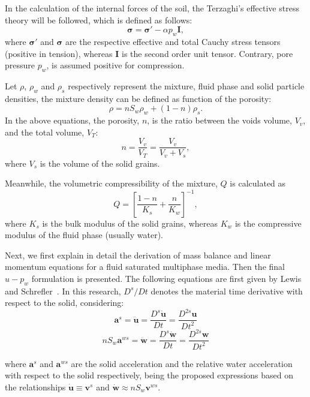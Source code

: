 \documentclass[twocolumn]{svjour3}          %
\begin{document}
In the calculation of the internal forces of the soil, the Terzaghi's effective stress theory  \cite{Terzaghi1925} will be followed, which is defined as follows:
\begin{equation}\label{eq_uw5}
 \boldsymbol{ \sigma} =\boldsymbol{ \sigma'} - \alpha p_{w}\textbf{I},
\end{equation}
where $ \boldsymbol{ \sigma'} $ and  $\boldsymbol{ \sigma}$ are the respective effective and total Cauchy stress tensors (positive in tension), whereas $\textbf{I}$ is the second order unit tensor.  Contrary, pore pressure $p_w$, is assumed positive for compression.

Let $\rho$, $\rho_{w}$ and $\rho_{s}$ respectively represent the mixture, fluid phase and solid particle densities,   the mixture density can be  defined as function of the porosity:
\begin{equation}\label{eq_uw2}
\rho=n S_w \rho_{w}+(1-n) \rho_s.
\end{equation}
In the above equations, the porosity, $n$, is the ratio  between the voids volume, $V_v$, and the total volume, $V_T$:
\begin{equation}\label{eq_uw3}
n=\frac{V_v}{V_T}=\frac{V_v}{V_v+V_s},
\end{equation}
where $V_s$ is the volume of the solid grains.

Meanwhile, the volumetric compressibility of the mixture, $Q$ \cite{Zienkiewicz99} is calculated as
\begin{equation}\label{eq_uw4}
Q = \left[ \frac{1-n}{K_s} + \frac{n}{K_w} \right]^{-1},
\end{equation}
where $K_s$ is the bulk modulus of  the solid grains, whereas  $K_w$ is  the compressive modulus of the fluid phase (usually water).

Next, we first  explain in detail the derivation of mass balance and linear momentum equations for a fluid saturated multiphase media. Then the final $u-p_w$ formulation is presented. The following equations are first given by Lewis and Schrefler~\cite{LewisSchrefler98}. In this research, $D^s/Dt$ denotes the material time derivative with respect to the solid, considering:
$$
\boldsymbol{a}^s =  \ddot{\boldsymbol{u}} = \frac{D^s \dot{\boldsymbol{u}}}{Dt} = \frac{D^{2s} \boldsymbol{u}}{Dt^2}
$$
$$
n S_w \boldsymbol{a}^{ws} =  \ddot{\boldsymbol{w}} = \frac{D^s \dot{\boldsymbol{w}}}{Dt} = \frac{D^{2s} \boldsymbol{w}}{Dt^2}
$$

where  $\boldsymbol{a}^s$ and $\boldsymbol{a}^{ws}$ are the solid acceleration and the relative water acceleration with respect to the solid respectively, being the proposed expressions based on the relationships $\boldsymbol{\dot{u}} \equiv \boldsymbol{v}^{s}$ and $\boldsymbol{\dot{w}} \approx nS_w \boldsymbol{v}^{ws}$.
\end{document}
